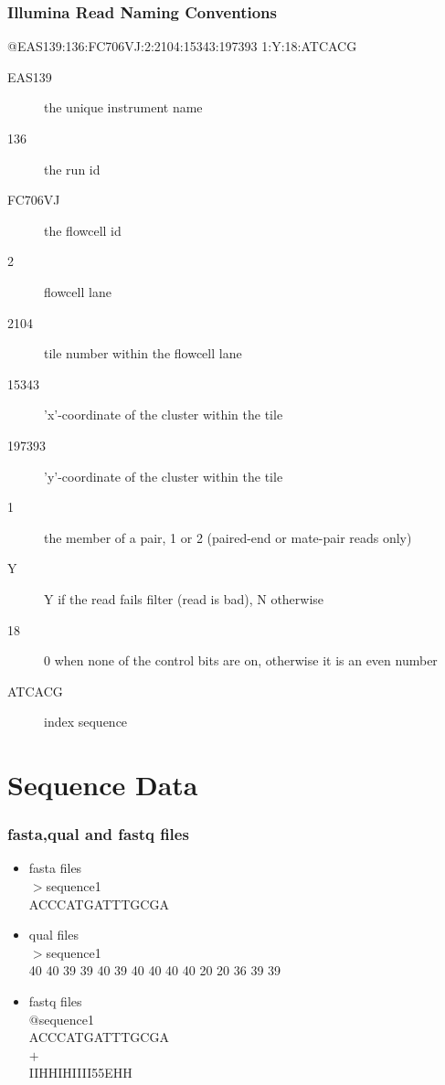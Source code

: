 \documentclass[pdf]{beamer}
\begin{document}
\begin{frame}
  \frametitle{Illumina Read Naming Conventions}
  \begin{small}
  @EAS139:136:FC706VJ:2:2104:15343:197393 1:Y:18:ATCACG\\
  \end{small}  
  \begin{description}
  \item[EAS139]	the unique instrument name
  \item[136]	the run id
  \item[FC706VJ]	the flowcell id
  \item[2]	flowcell lane
  \item[2104]	tile number within the flowcell lane
  \item[15343]	'x'-coordinate of the cluster within the tile
  \item[197393]	'y'-coordinate of the cluster within the tile
  \item[1]	the member of a pair, 1 or 2 (paired-end or mate-pair reads only)
  \item[Y]	Y if the read fails filter (read is bad), N otherwise
  \item[18]	0 when none of the control bits are on, otherwise it is an even     number
  \item[ATCACG]	index sequence
  \end{description}
\end{frame}

\section{Sequence Data}
\begin{frame}
  \frametitle{fasta,qual and fastq files}
  \begin{itemize}
  \item fasta files\\%
  $>$sequence1\\
  ACCCATGATTTGCGA
  \item qual files\\%
  $>$sequence1\\
  40 40 39 39 40 39 40 40 40 40 20 20 36 39 39
  \item fastq files\\%
  $@$sequence1\\
  ACCCATGATTTGCGA\\
  $+$\\
  IIHHIHIIII55EHH
  \end{itemize}
\end{frame}
\end{document}
